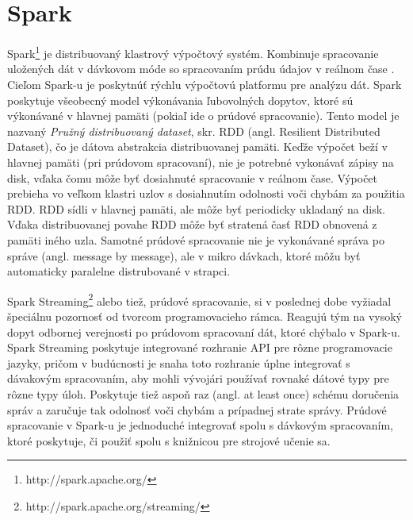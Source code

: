 \section{Spark}
Spark\footnote{http://spark.apache.org/} je distribuovaný klastrový výpočtový systém. Kombinuje spracovanie uložených dát v dávkovom móde so spracovaním prúdu údajov v reálnom čase \citep{cimerman2015prudy}. Cieľom Spark-u je poskytnúť rýchlu výpočtovú platformu pre analýzu dát. Spark poskytuje všeobecný model výkonávania ľubovolných dopytov, ktoré sú výkonávané v hlavnej pamäti (pokiaľ ide o prúdové spracovanie). Tento model je nazvaný \textit{Pružný distribuovaný dataset}, skr. RDD (angl. Resilient Distributed Dataset), čo je dátova abstrakcia distribuovanej pamäti. Keďže výpočet beží v hlavnej pamäti (pri prúdovom spracovaní), nie je potrebné vykonávať zápisy na disk, vďaka čomu môže byť dosiahnuté spracovanie v reálnom čase. Výpočet prebieha vo veľkom klastri uzlov s dosiahnutím odolnosti voči chybám za použitia RDD. RDD  sídli v hlavnej pamäti, ale môže byť periodicky ukladaný na disk. Vďaka distribuovanej povahe RDD môže byť stratená časť RDD obnovená z pamäti iného uzla. Samotné prúdové spracovanie nie je vykonávané správa po správe (angl. message by message), ale v mikro dávkach, ktoré môžu byť automaticky paralelne distrubované v strapci.
\par
Spark Streaming\footnote{http://spark.apache.org/streaming/} alebo tiež, prúdové spracovanie, si v poslednej dobe vyžiadal špeciálnu pozornosť od tvorcom programovacieho rámca. Reagujú tým na vysoký dopyt odbornej verejnosti po prúdovom spracovaní dát, ktoré chýbalo v Spark-u. Spark Streaming poskytuje integrované rozhranie API pre rôzne programovacie jazyky, pričom v budúcnosti je snaha toto rozhranie úplne integrovať s dávakovým spracovaním, aby mohli vývojári používať rovnaké dátové typy pre rôzne typy úloh. Poskytuje tiež aspoň raz (angl. at least once) schému doručenia správ a zaručuje tak odolnosť voči chybám a prípadnej strate správy. Prúdové spracovanie v Spark-u je jednoduché integrovať spolu s dávkovým spracovaním, ktoré poskytuje, či použiť spolu s knižnicou pre strojové učenie sa. 

